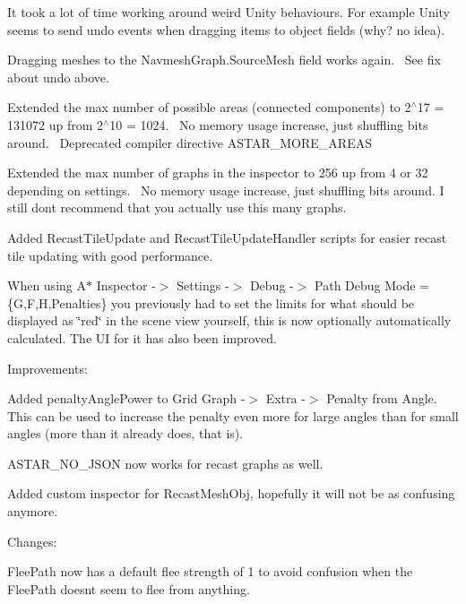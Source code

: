 \begin{DoxyItemize}
\begin{DoxyItemize}
\begin{DoxyItemize}
 It took a lot of time working around weird Unity behaviours. For example Unity seems to send undo events when dragging items to object fields (why? no idea).
\item Dragging meshes to the Navmesh\+Graph.\+Source\+Mesh field works again.~\newline
 See fix about undo above.
\item Extended the max number of possible areas (connected components) to 2$^\wedge$17 = 131072 up from 2$^\wedge$10 = 1024.~\newline
 No memory usage increase, just shuffling bits around.~\newline
 Deprecated compiler directive A\+S\+T\+A\+R\+\_\+\+M\+O\+R\+E\+\_\+\+A\+R\+E\+AS
\item Extended the max number of graphs in the inspector to 256 up from 4 or 32 depending on settings.~\newline
 No memory usage increase, just shuffling bits around. I still don\textquotesingle{}t recommend that you actually use this many graphs.
\item Added Recast\+Tile\+Update and Recast\+Tile\+Update\+Handler scripts for easier recast tile updating with good performance.
\item When using A$\ast$ Inspector -\/$>$ Settings -\/$>$ Debug -\/$>$ Path Debug Mode = \{G,F,H,Penalties\} you previously had to set the limits for what should be displayed as \char`\"{}red\char`\"{} in the scene view yourself, this is now optionally automatically calculated. The UI for it has also been improved.
\end{DoxyItemize}
\item Improvements\+:
\begin{DoxyItemize}
\item Added penalty\+Angle\+Power to Grid Graph -\/$>$ Extra -\/$>$ Penalty from Angle.~\newline
 This can be used to increase the penalty even more for large angles than for small angles (more than it already does, that is).
\item A\+S\+T\+A\+R\+\_\+\+N\+O\+\_\+\+J\+S\+ON now works for recast graphs as well.
\item Added custom inspector for Recast\+Mesh\+Obj, hopefully it will not be as confusing anymore.
\end{DoxyItemize}
\item Changes\+:
\begin{DoxyItemize}
\item Flee\+Path now has a default flee strength of 1 to avoid confusion when the Flee\+Path doesn\textquotesingle{}t seem to flee from anything.

\end{DoxyItemize}
\end{DoxyItemize}
\end{DoxyItemize}
